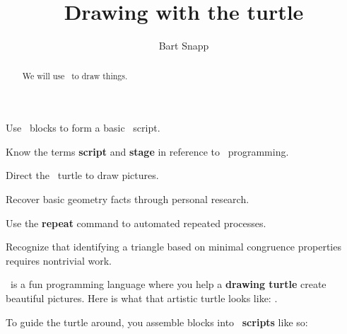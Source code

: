 \documentclass[handout,noauthor,nooutcomes]{ximera}
\title{Drawing with the turtle}
\author{Bart Snapp}
\begin{document}
\begin{abstract}
  We will use \snap\ to draw things.
\end{abstract}
\maketitle

\begin{listOutcomes}
\item{Use \snap\ blocks to form a basic \snap\ script.}
\item{Know the terms \textbf{script} and \textbf{stage} in reference to \snap\ programming.}
\item{Direct the \snap\ turtle to draw pictures.}
\item{Recover basic geometry facts through personal research.}
\item{Use the \textbf{repeat} command to automated repeated processes.}
\item{Recognize that identifying a triangle based on minimal
  congruence properties requires nontrivial work.}
\end{listOutcomes}

\snap\ is a fun programming language where you help a \textbf{drawing
  turtle} create beautiful pictures.  Here is what that artistic
turtle looks like:
.


To guide the turtle around, you assemble blocks into
\snap\ \textbf{scripts} like so:

\mynewpage
\end{document}
